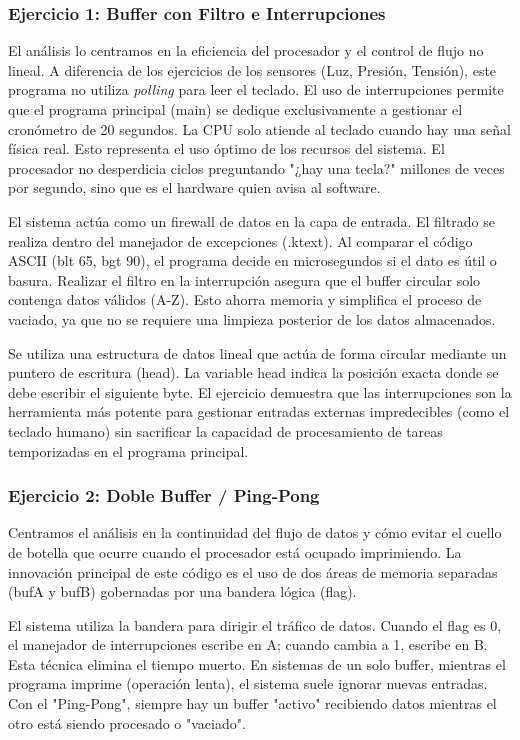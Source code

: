 \documentclass[12pt]{article}
\begin{document}
\subsubsection*{Ejercicio 1: Buffer con Filtro e Interrupciones}

El análisis lo centramos en la eficiencia del procesador y el control de flujo no lineal. A diferencia de los ejercicios de los sensores (Luz, Presión, Tensión), este programa no utiliza \textit{polling} para leer el teclado. El uso de interrupciones permite que el programa principal (main) se dedique exclusivamente a gestionar el cronómetro de 20 segundos. La CPU solo atiende al teclado cuando hay una señal física real. Esto representa el uso óptimo de los recursos del sistema. El procesador no desperdicia ciclos preguntando "¿hay una tecla?" millones de veces por segundo, sino que es el hardware quien avisa al software.

El sistema actúa como un firewall de datos en la capa de entrada. El filtrado se realiza dentro del manejador de excepciones (.ktext). Al comparar el código ASCII (blt 65, bgt 90), el programa decide en microsegundos si el dato es útil o basura. Realizar el filtro en la interrupción asegura que el buffer circular solo contenga datos válidos (A-Z). Esto ahorra memoria y simplifica el proceso de vaciado, ya que no se requiere una limpieza posterior de los datos almacenados.

Se utiliza una estructura de datos lineal que actúa de forma circular mediante un puntero de escritura (head). La variable head indica la posición exacta donde se debe escribir el siguiente byte. El ejercicio demuestra que las interrupciones son la herramienta más potente para gestionar entradas externas impredecibles (como el teclado humano) sin sacrificar la capacidad de procesamiento de tareas temporizadas en el programa principal.

\subsubsection*{Ejercicio 2: Doble Buffer / Ping-Pong}

Centramos el análisis en la continuidad del flujo de datos y cómo evitar el cuello de botella que ocurre cuando el procesador está ocupado imprimiendo. La innovación principal de este código es el uso de dos áreas de memoria separadas (bufA y bufB) gobernadas por una bandera lógica (flag).

El sistema utiliza la bandera para dirigir el tráfico de datos. Cuando el flag es 0, el manejador de interrupciones escribe en A; cuando cambia a 1, escribe en B. Esta técnica elimina el tiempo muerto. En sistemas de un solo buffer, mientras el programa imprime (operación lenta), el sistema suele ignorar nuevas entradas. Con el "Ping-Pong", siempre hay un buffer "activo" recibiendo datos mientras el otro está siendo procesado o "vaciado".
\end{document}
